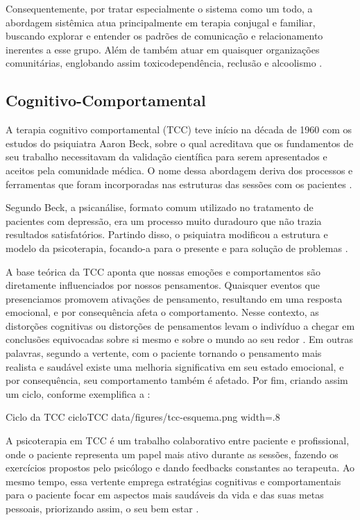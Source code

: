 Consequentemente, por tratar especialmente o sistema como um todo, a abordagem sistêmica atua principalmente em terapia conjugal e familiar, buscando explorar e entender os padrões de comunicação e relacionamento inerentes a esse grupo. Além de também atuar em quaisquer organizações comunitárias, englobando assim toxicodependência, reclusão e alcoolismo \cite{Psychotherapy2009}.

\subsection{Cognitivo-Comportamental}
\label{sec:cognitivoComportamental}
A terapia cognitivo comportamental (TCC) teve início na década de 1960 com os estudos do psiquiatra Aaron Beck, sobre o qual acreditava que os fundamentos de seu trabalho necessitavam da validação científica para serem apresentados e aceitos pela comunidade médica. O nome dessa abordagem deriva dos processos e ferramentas que foram incorporadas nas estruturas das sessões com os pacientes \cite{Nogueira2018}.

Segundo Beck, a psicanálise, formato comum utilizado no tratamento de pacientes com depressão, era um processo muito duradouro que não trazia resultados satisfatórios. Partindo disso, o psiquiatra modificou a estrutura e modelo da psicoterapia, focando-a para o presente e para solução de problemas \cite{Barros2022}.

A base teórica da TCC aponta que nossas emoções e comportamentos são diretamente influenciados por nossos pensamentos. Quaisquer eventos que presenciamos promovem ativações de pensamento, resultando em uma resposta emocional, e por consequência afeta o comportamento. Nesse contexto, as distorções cognitivas ou distorções de pensamentos levam o indivíduo a chegar em conclusões equivocadas sobre si mesmo e sobre o mundo ao seu redor \cite{Education2023}. Em outras palavras, segundo a vertente, com o paciente tornando o pensamento mais realista e saudável existe uma melhoria significativa em seu estado emocional, e por consequência, seu comportamento também é afetado. Por fim, criando assim um ciclo, conforme exemplifica a :

\image
    {Ciclo da TCC}
    {cicloTCC}
    {data/figures/tcc-esquema.png}
    {width=.8\textwidth}
    {}

A psicoterapia em TCC é um trabalho colaborativo entre paciente e profissional, onde o paciente representa um papel mais ativo durante as sessões, fazendo os exercícios propostos pelo psicólogo e dando feedbacks constantes ao terapeuta. Ao mesmo tempo, essa vertente emprega estratégias cognitivas e comportamentais para o paciente focar em aspectos mais saudáveis da vida e das suas metas pessoais, priorizando assim, o seu bem estar \cite{Education2023}.